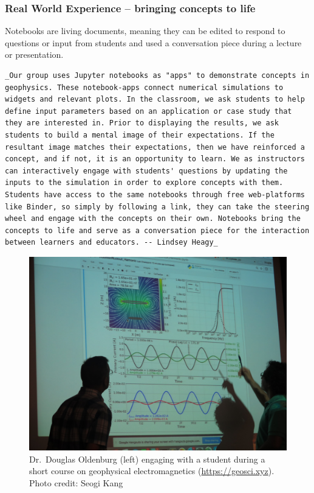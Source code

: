 \documentclass[]{book}
\begin{document}
\subsubsection{Real World Experience -- bringing concepts to
life}\label{real-world-experience-bringing-concepts-to-life}

Notebooks are living documents, meaning they can be edited to respond to
questions or input from students and used a conversation piece during a
lecture or presentation.

\begin{verbatim}
_Our group uses Jupyter notebooks as "apps" to demonstrate concepts in geophysics. These notebook-apps connect numerical simulations to widgets and relevant plots. In the classroom, we ask students to help define input parameters based on an application or case study that they are interested in. Prior to displaying the results, we ask students to build a mental image of their expectations. If the resultant image matches their expectations, then we have reinforced a concept, and if not, it is an opportunity to learn. We as instructors can interactively engage with students' questions by updating the inputs to the simulation in order to explore concepts with them. Students have access to the same notebooks through free web-platforms like Binder, so simply by following a link, they can take the steering wheel and engage with the concepts on their own. Notebooks bring the concepts to life and serve as a conversation piece for the interaction between learners and educators. -- Lindsey Heagy_
\end{verbatim}

\begin{figure}
\centering
\includegraphics{images/oldenburg-geosci.jpg}
\caption{Dr.~Douglas Oldenburg (left) engaging with a student during a
short course on geophysical electromagnetics (\url{https://geosci.xyz}).
Photo credit: Seogi Kang}
\end{figure}
\end{document}
